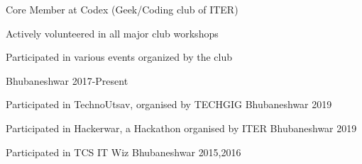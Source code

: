 



\begin{cvhonors1}
  \cvhonore
    {Core Member at Codex (Geek/Coding club of ITER)} %
    {
      \begin{cvitems} %
        \item {}
        \item {Actively volunteered in all major club workshops}
        \item {Participated in various events organized by the club}
      \end{cvitems}
    } %
    {Bhubaneshwar} %
    {2017-Present} %

  \cvhonore
    {Participated in TechnoUtsav, organised by TECHGIG} %
    {} %
    {Bhubaneshwar} %
    {2019} %

  

  \cvhonore
    {Participated in Hackerwar, a Hackathon organised by ITER} %
    {} %
    {Bhubaneshwar} %
    {2019} %

  \cvhonore
    {Participated in TCS IT Wiz} %
    {} %
    {Bhubaneshwar} %
    {2015,2016} %


\end{cvhonors1}

